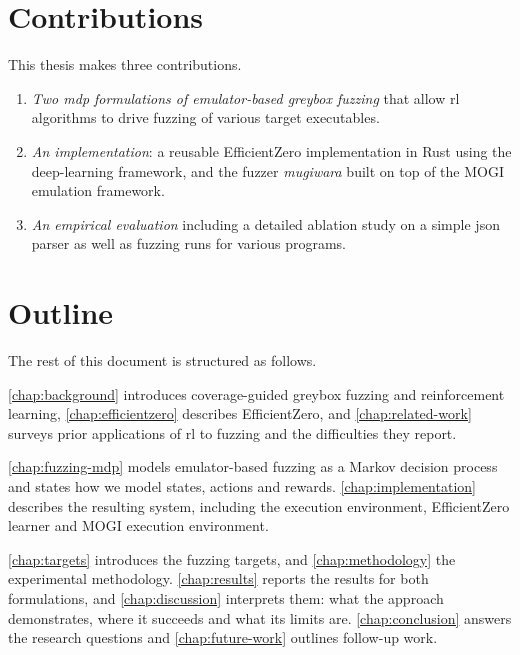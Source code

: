 \section{Contributions}\label{sec:introduction-contributions}

This thesis makes three contributions.

\begin{enumerate}
  \item \emph{Two \gls{mdp} formulations of emulator-based greybox fuzzing} that allow
    \gls{rl} algorithms to drive fuzzing of various target executables.

  \item \emph{An implementation}: a reusable EfficientZero implementation in Rust
    using the  deep-learning framework, and the fuzzer \emph{mugiwara}
    built on top of the MOGI emulation framework.

  \item \emph{An empirical evaluation} including a detailed ablation study
    on a simple \gls{json} parser as well as fuzzing runs for various programs.
\end{enumerate}

\section{Outline}\label{sec:introduction-outline}

The rest of this document is structured as follows.

\cref{chap:background} introduces coverage-guided greybox fuzzing and
reinforcement learning, \cref{chap:efficientzero} describes EfficientZero, and
\cref{chap:related-work} surveys prior applications of \gls{rl} to fuzzing and the
difficulties they report.

\cref{chap:fuzzing-mdp} models emulator-based fuzzing as a Markov decision
process and states how we model states, actions and rewards.
\cref{chap:implementation} describes the resulting system, including
the execution environment, EfficientZero learner and MOGI execution environment.

\cref{chap:targets} introduces the fuzzing targets, and \cref{chap:methodology}
the experimental methodology.
\cref{chap:results} reports the results for both formulations, and
\cref{chap:discussion} interprets them: what the approach demonstrates, where
it succeeds and what its limits are.
\cref{chap:conclusion} answers the research questions and
\cref{chap:future-work} outlines follow-up work.

